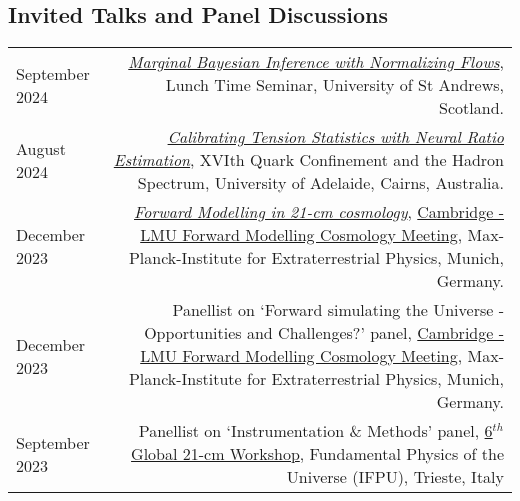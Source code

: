 \documentclass{article}
\begin{document}
\subsection*{Invited Talks and Panel Discussions}
\begin{tabular}{L!{\vrule}R}
September 2024 & \href{https://github.com/htjb/Talks/raw/master/Talks/St-Andrews-Seminar-Sept-2024/standrews24.pdf}{\textit{Marginal Bayesian Inference with Normalizing Flows}}, Lunch Time Seminar, University of St Andrews, Scotland. \\ 
August 2024 & \href{https://indico.cern.ch/event/1293041/contributions/5970077/}{\textit{Calibrating Tension Statistics with Neural Ratio Estimation}}, XVIth Quark Confinement and the Hadron Spectrum, University of Adelaide, Cairns, Australia. \\
December 2023 & \href{https://github.com/htjb/Talks/raw/master/Talks/cambridge-lmu/Cambridge-LMU.pdf}{\textit{Forward Modelling in 21-cm cosmology}}, \href{https://indico.physik.uni-muenchen.de/event/394/}{Cambridge - LMU Forward Modelling Cosmology Meeting}, Max-Planck-Institute for Extraterrestrial Physics, Munich, Germany.\\
December 2023 & Panellist on `Forward simulating the Universe - Opportunities and Challenges?' panel, \href{https://indico.physik.uni-muenchen.de/event/394/}{Cambridge - LMU Forward Modelling Cosmology Meeting}, Max-Planck-Institute for Extraterrestrial Physics, Munich, Germany. \\
September 2023 & Panellist on `Instrumentation \& Methods' panel, \href{https://global21cmworkshop.org/2023-ifpu/}{6$^{th}$ Global 21-cm Workshop}, Fundamental Physics of the Universe (IFPU), Trieste, Italy \\
\end{tabular}
\end{document}
